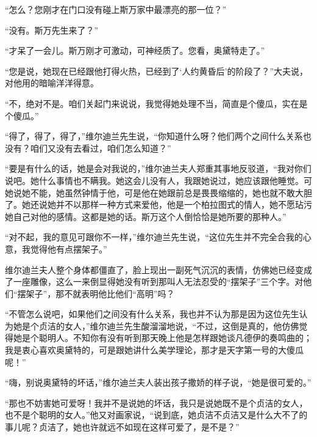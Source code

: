 \par “怎么？您刚才在门口没有碰上斯万家中最漂亮的那一位？”
\par “没有。斯万先生来了？”
\par “才呆了一会儿。斯万刚才可激动，可神经质了。您看，奥黛特走了。”
\par “您是说，她现在已经跟他打得火热，已经到了‘人约黄昏后’的阶段了？”大夫说，对他用的暗喻洋洋得意。
\par “不，绝对不是。咱们关起门来说说，我觉得她处理不当，简直是个傻瓜，实在是个傻瓜。”
\par “得了，得了，得了，”维尔迪兰先生说，“你知道什么呀？他们两个之间什么关系也没有？咱们又没有去看过，咱们怎么知道？”
\par “要是有什么的话，她是会对我说的，”维尔迪兰夫人郑重其事地反驳道，“我对你们说吧。她什么事情也不瞒我。她这会儿没有人，我跟她说过，她应该跟他睡觉。可她说她不能，她虽然钟情于他，可是他在她跟前总是畏畏缩缩的，她也就不敢大胆了。她还说她并不以那样一种方式来爱他，他是一个柏拉图式的情人，她不愿玷污她自己对他的感情。这都是她的话。斯万这个人倒恰恰是她所要的那种人。”
\par “对不起，我的意见可跟你不一样，”维尔迪兰先生说，“这位先生并不完全合我的心意，我觉得他有点摆架子。”
\par 维尔迪兰夫人整个身体都僵直了，脸上现出一副死气沉沉的表情，仿佛她已经变成了一座雕像，这么一来倒显得她没有听到那叫人无法忍受的“摆架子”三个字。对他们“摆架子”，那不就表明他比他们“高明”吗？
\par “不管怎么说吧，如果他们之间没有什么关系，我也并不认为那是因为这位先生认为她是个贞洁的女人，”维尔迪兰先生酸溜溜地说，“不过，这倒是真的，他仿佛觉得她是个聪明人。不知你有没有听到那天晚上他是怎样跟她谈凡德伊的奏鸣曲的；我是衷心喜欢奥黛特的，可是跟她讲什么美学理论，那才是天字第一号的大傻瓜呢！”
\par “嗨，别说奥黛特的坏话，”维尔迪兰夫人装出孩子撒娇的样子说，“她是很可爱的。”
\par “那也不妨害她可爱呀！我并不是说她的坏话，我只是说她既不是个贞洁的女人，也不是个聪明的女人。”他又对画家说，“说到底，她贞洁不贞洁又是什么大不了的事儿呢？贞洁了，她也许就远不如现在这样可爱了，是不是？”
